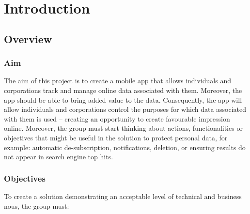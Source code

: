 \section{Introduction}

\subsection{Overview}

\subsubsection{Aim}

The aim of this project is to create a mobile app that allows individuals and corporations track and manage online data associated with them. Moreover, the app should be able to bring added value to the data. Consequently, the app will allow individuals and corporations control the purposes for which data associated with them is used – creating an opportunity to create favourable impression online. Moreover, the group must start thinking about actions, functionalities or objectives that might be useful in the solution to protect personal data, for example: automatic de-subscription, notifications, deletion, or ensuring results do not appear in search engine top hits.

\subsubsection{Objectives}

To create a solution demonstrating an acceptable level of technical and business nous, the group must:


